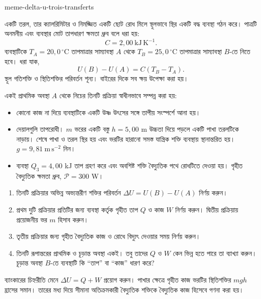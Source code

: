 \begin{exo}[একই অভ্যন্তরীণ শক্তির পরিবর্তন, স্থানান্তরের তিন পদ্ধতি]{meme-delta-u-trois-transferts}

একটি তরল, তার ক্যালরিমিটার ও নিমজ্জিত একটি ছোট রোধ মিলে স্থূলভাবে স্থির
একটি বদ্ধ ব্যবস্থা গঠন করে। পাত্রটি অনমনীয় এবং ব্যবস্থার মোট তাপধারণ ক্ষমতা
ধ্রুব বলে ধরা হয়:
\[
C=2{,}00\ \mathrm{kJ\,K^{-1}}.
\]
ব্যবস্থাটিকে $T_A=20{,}0\,^\circ\mathrm{C}$ তাপমাত্রার সাম্যাবস্থা $A$ থেকে
$T_B=25{,}0\,^\circ\mathrm{C}$ তাপমাত্রার সাম্যাবস্থা $B$-তে নিতে হবে। ধরা যাক,
\[
U(B)-U(A)=C(T_B-T_A).
\]
স্থূল গতিশক্তি ও স্থিতিশক্তির পরিবর্তন শূন্য। বাইরের দিকে সব ক্ষয় উপেক্ষা করা হয়।

একই প্রাথমিক অবস্থা $A$ থেকে নিচের তিনটি প্রক্রিয়া স্বাধীনভাবে সম্পন্ন করা হয়:
\begin{itemize}
\item[প্রক্রিয়া ১] কোনো কাজ না দিয়ে ব্যবস্থাটিকে একটি উষ্ণ উৎসের সঙ্গে তাপীয় সংস্পর্শে আনা হয়।
\item[প্রক্রিয়া ২] দেয়ালগুলি তাপরোধী। $m$ ভরের একটি বস্তু $h=5{,}00$ m উচ্চতা দিয়ে পড়লে একটি পাখা তরলটিকে নাড়ায়। শেষে পাখা ও তরল স্থির হয় এবং ভরটির হারানো সমস্ত যান্ত্রিক শক্তি ব্যবস্থায় স্থানান্তরিত হয়। $g=9{,}81\ \mathrm{m\,s^{-2}}$ নিন।
\item[প্রক্রিয়া ৩] ব্যবস্থা $Q_3=4{,}00$ kJ তাপ গ্রহণ করে এবং অবশিষ্ট শক্তি বৈদ্যুতিক পথে রোধটিতে দেওয়া হয়। গৃহীত বৈদ্যুতিক ক্ষমতা ধ্রুব, $\mathcal P=300$ W।
\end{itemize}

\begin{enumerate}
\item তিনটি প্রক্রিয়ার অভিন্ন অভ্যন্তরীণ শক্তির পরিবর্তন $\Delta U=U(B)-U(A)$ নির্ণয় করুন।
\item প্রথম দুটি প্রক্রিয়ার প্রতিটির জন্য ব্যবস্থা কর্তৃক গৃহীত তাপ $Q$ ও কাজ $W$ নির্ণয় করুন। দ্বিতীয় প্রক্রিয়ায় প্রয়োজনীয় ভর $m$ হিসাব করুন।
\item তৃতীয় প্রক্রিয়ার জন্য গৃহীত বৈদ্যুতিক কাজ ও রোধে বিদ্যুৎ দেওয়ার সময় নির্ণয় করুন।
\item তিনটি রূপান্তরের প্রাথমিক ও চূড়ান্ত অবস্থা একই। তবু তাদের $Q$ ও $W$ কেন ভিন্ন হতে পারে তা ব্যাখ্যা করুন। চূড়ান্ত অবস্থা $B$-তে ব্যবস্থাটি কি “তাপ” বা “কাজ” ধারণ করে?
\end{enumerate}

\begin{indication}
ব্যাংকারের চিহ্নরীতি মেনে $\Delta U=Q+W$ প্রয়োগ করুন। পাখার ক্ষেত্রে গৃহীত
কাজ ভরটির স্থিতিশক্তির $mgh$ হ্রাসের সমান। তারের মধ্য দিয়ে সীমানা অতিক্রমকারী
বৈদ্যুতিক শক্তিকে বৈদ্যুতিক কাজ হিসেবে গণনা করা হয়।
\end{indication}


\end{exo}
